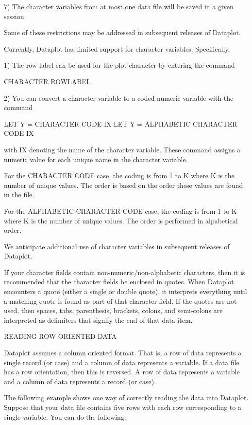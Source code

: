    7) The character variables from at most one data file
      will be saved in a given session.

Some of these restrictions may be addressed in subsequent
releases of Dataplot.

Currently, Dataplot has limited support for character variables.
Specifically,

   1) The row label can be used for the plot character by
      entering the command

        CHARACTER ROWLABEL

   2) You can convert a character variable to a coded numeric
      variable with the command

        LET Y = CHARACTER CODE IX
        LET Y = ALPHABETIC CHARACTER CODE IX

      with IX denoting the name of the character variable.  These
      command assigns a numeric value for each unique name in
      the character variable.

      For the CHARACTER CODE case, the coding is from 1 to K where
      K is the number of unique values.  The order is based on
      the order these values are found in the file.

      For the ALPHABETIC CHARACTER CODE case, the coding is from
      1 to K where K is the number of unique values.  The order is
      performed in alpabetical order.

We anticipate additional use of character variables in subsequent
releases of Dataplot.

If your character fields contain non-numeric/non-alphabetic characters,
then it is recommended that the character fields be enclosed in
quotes.  When Dataplot encounters a quote (either a single or double
quote), it interprets everything until a matching quote is found
as part of that character field.  If the quotes are not used,
then spaces, tabs, parenthesis, brackets, colons, and semi-colons
are interpreted as delimiters that signify the end of that data item.


READING ROW ORIENTED DATA

Dataplot assumes a column oriented format.  That is, a row of
data represents a single record (or case) and a column of data 
represents a variable.  If a data file has a row orientation, then
this is reversed.  A row of data represents a variable and a column
of data represents a record (or case).

The following example shows one way of correctly reading the data
into Dataplot.  Suppose that your data file contains five rows with
each row corresponding to a single variable.  You can do the following:

